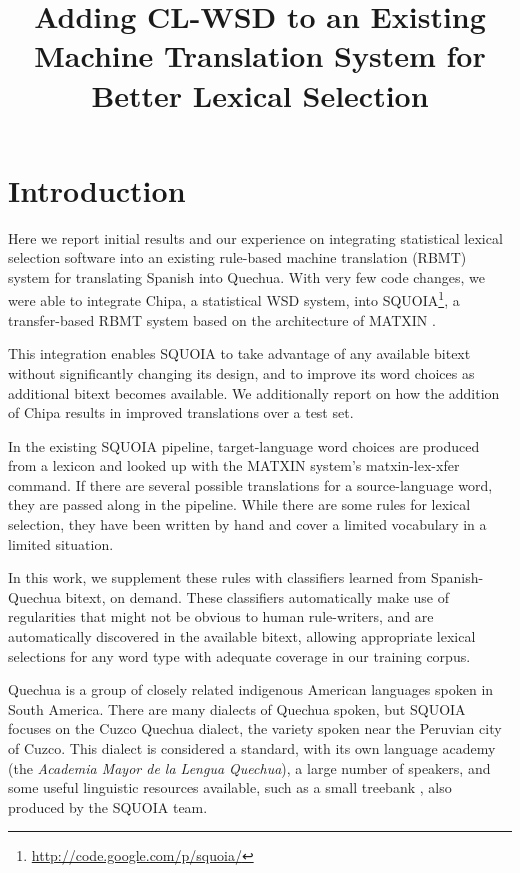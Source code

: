 \documentclass[10pt, a4paper]{article}
\title{Adding CL-WSD to an Existing Machine Translation System for Better Lexical Selection}
\begin{document}
\maketitleabstract

\section{Introduction}
Here we report initial results and our experience on integrating statistical
lexical selection software into an existing rule-based machine translation
(RBMT) system for translating Spanish into Quechua.
With very few code changes, we were able to integrate Chipa, a statistical WSD
system, into SQUOIA\footnote{\url{http://code.google.com/p/squoia/}},
a transfer-based RBMT system based on the architecture of MATXIN
\cite{matxin_2005,matxin}.

This integration enables SQUOIA to take advantage of any available bitext
without significantly changing its design, and to improve its word choices as
additional bitext becomes available.
We additionally report on how the addition of Chipa results in improved
translations over a test set.

In the existing SQUOIA pipeline, target-language word choices are produced from
a lexicon and looked up with the MATXIN system's matxin-lex-xfer command.
If there are
several possible translations for a source-language word, they are passed along
in the pipeline. While there are some rules for lexical selection, they have
been written by hand and cover a limited vocabulary in a limited situation.

In this work, we supplement these rules with classifiers learned from
Spanish-Quechua bitext, on demand. These classifiers automatically make use of
regularities that might not be obvious to human rule-writers, and are
automatically discovered in the available bitext, allowing appropriate lexical
selections for any word type with adequate coverage in our training corpus.

Quechua is a group of closely related indigenous American languages spoken in
South America. There are many dialects of Quechua spoken, but SQUOIA focuses on
the Cuzco Quechua dialect, the variety spoken near the Peruvian city of Cuzco.
This dialect is considered a standard, with its own language academy
(the \emph{Academia Mayor de la Lengua Quechua}), a large number of speakers,
and some useful linguistic resources available, such as a small treebank
\cite{rios2009quechua}, also produced by the SQUOIA team.
\end{document}
